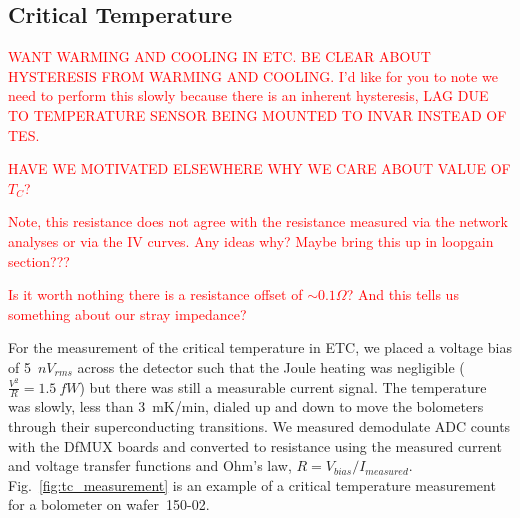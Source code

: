 


\subsection{Critical Temperature}
\label{sec:critical_temp}

\textcolor{red}{WANT WARMING AND COOLING IN ETC. BE CLEAR ABOUT HYSTERESIS FROM WARMING AND COOLING. I'd like for you to note we need to perform this slowly because there is an inherent hysteresis, LAG DUE TO TEMPERATURE SENSOR BEING MOUNTED TO INVAR INSTEAD OF TES.}

\textcolor{red}{HAVE WE MOTIVATED ELSEWHERE WHY WE CARE ABOUT VALUE OF $T_{C}$?}

\textcolor{red}{Note, this resistance does not agree with the resistance measured via the network analyses or via the IV curves. Any ideas why? Maybe bring this up in loopgain section???}

\textcolor{red}{Is it worth nothing there is a resistance offset of $\sim 0.1 \Omega$? And this tells us something about our stray impedance?}

For the measurement of the critical temperature in \ac{ETC}, we placed a voltage bias of 5~$nV_{rms}$ across the detector such that the Joule heating was negligible ($\frac{V^2}{R} = 1.5~fW$) but there was still a measurable current signal. 
The temperature was slowly, less than 3~mK/min, dialed up and down to move the bolometers through their superconducting transitions. 
We measured demodulate \ac{ADC} counts with the \ac{DfMUX} boards and converted to resistance using the measured current and voltage transfer functions and Ohm's law, $R=V_{bias}/I_{measured}$.
Fig.~\ref{fig:tc_measurement} is an example of a critical temperature measurement for a bolometer on wafer~150-02. 

